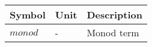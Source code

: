   \begin{tabular}{lll}\hline
    \textbf{Symbol} & \textbf{Unit} & \textbf{Description} \\ \hline
    $monod$ & - & Monod term \\ \hline
  \end{tabular}

